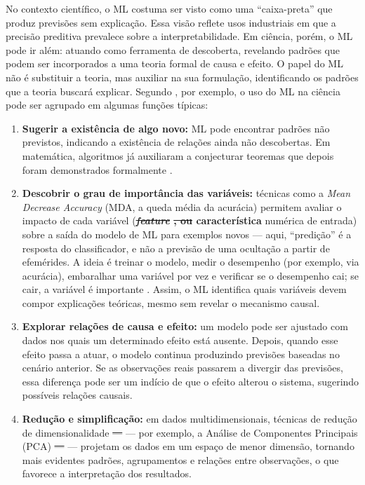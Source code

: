 \documentclass[msc]{on} %
\makeatletter
\providecommand{\DIFaddtex}[1]{{\protect\color{red}#1}} %
\providecommand{\DIFdeltex}[1]{{\protect\color{red}\sout{#1}}} %
\providecommand{\DIFaddbegin}{} %
\providecommand{\DIFaddend}{} %
\providecommand{\DIFdelbegin}{} %
\providecommand{\DIFdelend}{} %
\providecommand{\DIFadd}[1]{\texorpdfstring{\DIFaddtex{#1}}{#1}} %
\providecommand{\DIFdel}[1]{\texorpdfstring{\DIFdeltex{#1}}{}} %
\let\sout@orig\sout %
\renewcommand{\sout}[1]{\ifmmode\text{\sout@orig{\ensuremath{#1}}}\else\sout@orig{#1}\fi} %
\makeatother
\begin{document}
No contexto científico, o ML costuma ser visto como uma ``caixa-preta'' que produz previsões sem explicação. Essa visão reflete usos industriais em que a precisão preditiva prevalece sobre a interpretabilidade. Em ciência, porém, o ML pode ir além: atuando como ferramenta de descoberta, revelando padrões que podem ser incorporados a uma teoria formal de causa e efeito. O papel do ML não é substituir a teoria, mas auxiliar na sua formulação, identificando os padrões que a teoria buscará explicar. Segundo \cite{lopez2020ml}, por exemplo, o uso do ML na ciência pode ser agrupado em algumas funções típicas:

\begin{enumerate}
	\item[(i)] \textbf{Sugerir a existência de algo novo:} ML pode encontrar padrões não previstos, indicando a existência de relações ainda não descobertas. Em matemática, algoritmos já auxiliaram a conjecturar teoremas que depois foram demonstrados formalmente \citep{gryak2018conjugacy}.

	\item[(ii)] \textbf{Descobrir o grau de importância das variáveis:} técnicas como a \textit{Mean Decrease Accuracy} (MDA, a queda média da acurácia) permitem avaliar o impacto de cada variável (\textbf{\DIFdelbegin \textit{\DIFdel{feature}}%
\DIFdel{, ou }\DIFdelend característica\DIFaddbegin } \DIFaddend numérica de entrada) sobre a saída do modelo de ML para exemplos novos --- aqui, ``predição'' é a resposta do classificador, e não a previsão de uma ocultação a partir de efemérides. A ideia é treinar o modelo, medir o desempenho (por exemplo, via acurácia), embaralhar uma variável por vez e verificar se o desempenho cai; se cair, a variável é importante \citep{liu2004comparative}. Assim, o ML identifica quais variáveis devem compor explicações teóricas, mesmo sem revelar o mecanismo causal.

	\item[(iii)] \textbf{Explorar relações de causa e efeito:} um modelo pode ser ajustado com dados nos quais um determinado efeito está ausente. Depois, quando esse efeito passa a atuar, o modelo continua produzindo previsões baseadas no cenário anterior. Se as observações reais passarem a divergir das previsões, essa diferença pode ser um indício de que o efeito alterou o sistema, sugerindo possíveis relações causais.

	\item[(iv)] \textbf{Redução e simplificação:} em dados multidimensionais, técnicas de redução de dimensionalidade \DIFdelbegin \DIFdel{— }\DIFdelend\ifhmode\hskip0pt\fi \DIFaddbegin \DIFadd{--- }\DIFaddend por exemplo, a Análise de Componentes Principais (PCA) \DIFdelbegin \DIFdel{— }\DIFdelend\ifhmode\hskip0pt\fi \DIFaddbegin \DIFadd{--- }\DIFaddend projetam os dados em um espaço de menor dimensão, tornando mais evidentes padrões, agrupamentos e relações entre observações, o que favorece a interpretação dos resultados.


\end{enumerate}
\end{document}
